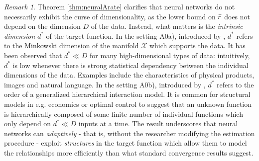 \documentclass[12pt]{article}
\theoremstyle{myplain}
\theoremstyle{definition}
\theoremstyle{definition}
\theoremstyle{remark}
\newtheorem{remark}{Remark}[section]
\numberwithin{equation}{section}
\begin{document}
\begin{remark}\label{rem:intrinsic}
Theorem \ref{thm:neuralArate} clarifies that neural networks do not necessarily exhibit the curse of dimensionality, as the lower bound on $\Bar r$ does not depend on the dimension $D$ of the data. Instead, what matters is the {\it intrinsic dimension} $d^*$ of the target function. In the setting A0a), introduced by \cite{minkowski}, $d^*$ refers to the Minkowski dimension of the manifold ${\mathcal{X}}$ which supports the data. It has been observed that $d^*\ll D$ for many high-dimensional types of data: intuitively, $d^*$ is low whenever there is strong statistical dependency between the individual dimensions of the data. Examples include the characteristics of physical products, images and natural language. In the setting A0b), introduced by \cite{bauer2019deep}, $d^*$ refers to the order of a generalized hierarchical interaction model. It is common for structural models in e.g. economics or optimal control to suggest that an unknown function is hierarchically composed of some finite number of individual functions which only depend on $d^*\ll D$ inputs at a time. The result underscores that neural networks can {\it adaptively} - that is, without the researcher modifying the estimation procedure - exploit {\it structures} in the target function which allow them to model the relationships more efficiently than what standard convergence results suggest.\end{remark}
\end{document}
